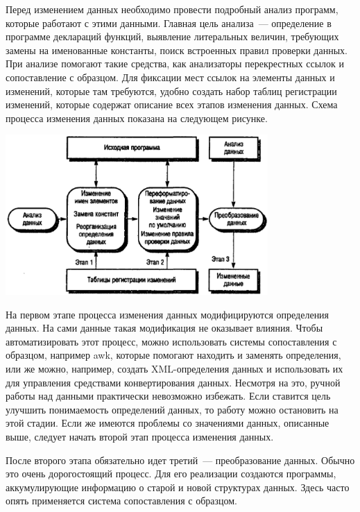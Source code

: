 \documentclass{../../text-style}
\begin{document}
Перед изменением данных необходимо провести подробный анализ программ, которые работают с этими данными. Главная цель анализа~--- определение в программе деклараций функций, выявление литеральных величин, требующих замены на именованные константы, поиск встроенных правил проверки данных. При анализе помогают такие средства, как анализаторы перекрестных ссылок и сопоставление с образцом. Для фиксации мест ссылок на элементы данных и изменений, которые там требуются, удобно создать набор таблиц регистрации изменений, которые содержат описание всех этапов изменения данных. Схема процесса изменения данных показана на следующем рисунке.

\begin{center}
    \includegraphics[width=0.75\textwidth]{dataReengineering.png}
\end{center}

На первом этапе процесса изменения данных модифицируются определения данных. На сами данные такая модификация не оказывает влияния. Чтобы автоматизировать этот процесс, можно использовать системы сопоставления с образцом, например awk, которые помогают находить и заменять определения, или же можно, например, создать XML-определения данных и использовать их для управления средствами конвертирования данных. Несмотря на это, ручной работы над данными практически невозможно избежать. Если ставится цель улучшить понимаемость определений данных, то работу можно остановить на этой стадии. Если же имеются проблемы со значениями данных, описанные выше, следует начать второй этап процесса изменения данных.

После второго этапа обязательно идет третий~--- преобразование данных. Обычно это очень дорогостоящий процесс. Для его реализации создаются программы, аккумулирующие информацию о старой и новой структурах данных. Здесь часто опять применяется система сопоставления с образцом.
\end{document}

